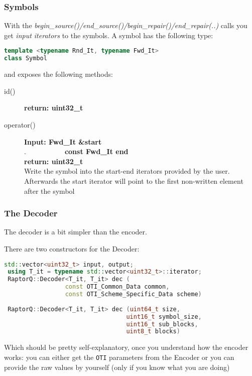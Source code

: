 \documentclass[11pt,a4paper]{refart}
\begin{document}
\subsubsection{Symbols}
With the \textit{begin\_source()/end\_source()/begin\_repair()/end\_repair(..)} calls you get \textit{input iterators} to the symbols. A symbol has the following type:
\begin{lstlisting}[language=C++]
template <typename Rnd_It, typename Fwd_It>
class Symbol
\end{lstlisting}
and exposes the	 following methods:
\begin{description}
\item[id()]\textbf{return: uint32\_t}
\item[operator()]\textbf{Input: Fwd\_It \&start}\\
.\ \ \ \ \ \ \ \ \ \ \ \textbf{const Fwd\_It end}\\
\textbf{return: uint32\_t}\\
Write the symbol into the start-end iterators provided by the user. Afterwards the start iterator will point to the first non-written element after the symbol
\end{description}



\newpage
\subsubsection{The Decoder}

The decoder is a bit simpler than the encoder.

There are two constructors for the Decoder:

\begin{lstlisting}[language=C++]
 std::vector<uint32_t> input, output;
 using T_it = typename std::vector<uint32_t>::iterator;
 RaptorQ::Decoder<T_it, T_it> dec (
                 const OTI_Common_Data common,
                 const OTI_Scheme_Specific_Data scheme)
                              
 RaptorQ::Decoder<T_it, T_it> dec (uint64_t size,
                                  uint16_t symbol_size,
                                  uint16_t sub_blocks,
                                  uint8_t blocks)
\end{lstlisting}

Which should be pretty self-explanatory, once you understand how the encoder works:
you can either get the \texttt{OTI} parameters from the Encoder or you can provide the raw values by yourself (only if you know what you are doing)
\end{document}
